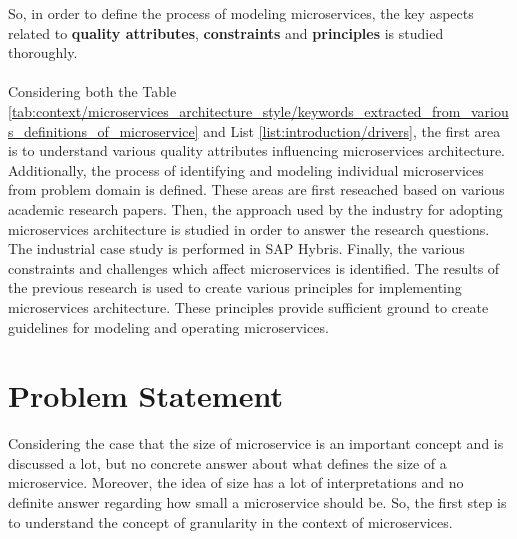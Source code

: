 So, in order to define the process of modeling microservices, the key aspects related to \textbf{quality attributes}, \textbf{constraints} and \textbf{principles} is studied thoroughly.
\\
\\
Considering both the Table \ref{tab:context/microservices_architecture_style/keywords_extracted_from_various_definitions_of_microservice} and List \ref{list:introduction/drivers}, the first area is to understand various quality attributes influencing microservices architecture. Additionally, the process of identifying and modeling individual microservices from problem domain is defined. These areas are first reseached based on various academic research papers. Then, the approach used by the industry for adopting microservices architecture is studied in order to answer the research questions. The industrial case study is performed in SAP Hybris.
Finally, the various constraints and challenges which affect microservices is identified. 
The results of the previous research is used to create various principles for implementing microservices architecture. These principles provide sufficient ground to create guidelines for modeling and operating microservices.

\section{Problem Statement}\label{section:context/problem_statement}
Considering the case that the size of microservice is an important concept and is discussed a lot, but no concrete answer about what defines the size of a microservice. Moreover, the idea of size has a lot of interpretations and no definite answer regarding how small a microservice should be. So, the first step is to understand the concept of granularity in the context of microservices.